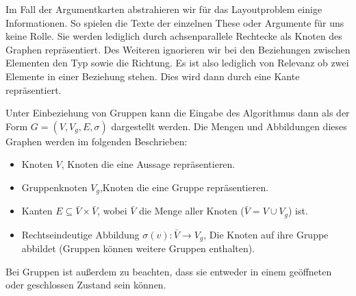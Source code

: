 Im Fall der Argumentkarten abstrahieren wir für das Layoutproblem einige Informationen. 
So spielen die Texte der einzelnen These oder Argumente für uns keine Rolle. 
Sie werden lediglich durch achsenparallele Rechtecke als Knoten des Graphen repräsentiert.
Des Weiteren ignorieren wir bei den Beziehungen zwischen Elementen den Typ sowie die Richtung. 
Es ist also lediglich von Relevanz ob zwei Elemente in einer Beziehung stehen.
Dies wird dann durch eine Kante repräsentiert. 

Unter Einbeziehung von Gruppen kann die Eingabe des Algorithmus dann als der Form $G = (V,V_g,E,\sigma)$ dargestellt werden. Die Mengen und Abbildungen dieses Graphen werden im folgenden Beschrieben:

\begin{itemize}
	\item Knoten $V$, Knoten die eine Aussage repräsentieren.
	\item Gruppenknoten $V_g$,Knoten die eine Gruppe repräsentieren.
	\item Kanten $E \subseteq \bar{V} \times \bar{V}$, wobei $\bar{V}$ die Menge aller Knoten ($\bar{V} = V \cup V_g$) ist.
	 \item Rechtseindeutige Abbildung $\sigma(v): \bar{V} \rightarrow V_g$, Die Knoten auf ihre Gruppe abbildet (Gruppen können weitere Gruppen enthalten).
\end{itemize}

Bei Gruppen ist außerdem zu beachten, dass sie entweder in einem geöffneten oder geschlossen Zustand sein können.




